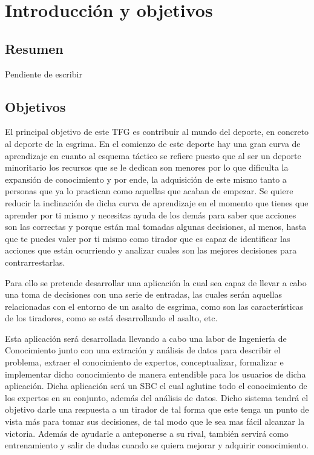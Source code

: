\chapter{Introducción y objetivos}
\label{cap: Introducción y objetivos}


\section{Resumen}
Pendiente de escribir

\section{Objetivos}

El principal objetivo de este TFG es contribuir al mundo del deporte, en concreto al
 deporte de la esgrima. En el comienzo de este deporte hay una gran curva de aprendizaje
 en cuanto al esquema táctico se refiere puesto que al ser un deporte minoritario los
 recursos que se le dedican son menores por lo que dificulta la expansión de conocimiento
 y por ende, la adquisición de este mismo tanto a personas que ya lo practican como aquellas
 que acaban de empezar. Se quiere reducir la inclinación de dicha curva de aprendizaje
 en el momento que tienes que aprender por ti mismo y necesitas ayuda de los demás
 para saber que acciones son las correctas y porque están mal tomadas algunas decisiones,
 al menos, hasta que te puedes valer por ti mismo como tirador que es capaz de identificar
 las acciones que están ocurriendo y analizar cuales son las mejores decisiones para contrarrestarlas.

Para ello se pretende desarrollar una aplicación la cual sea capaz de llevar a
 cabo una toma de decisiones con una serie de entradas, las cuales serán aquellas
 relacionadas con el entorno de un asalto de esgrima, como son las características
 de los tiradores, como se está desarrollando el asalto, etc.

Esta aplicación será desarrollada llevando a cabo una labor de Ingeniería de Conocimiento
 junto con una extración y análisis de datos para describir el problema, extraer
 el conocimiento de expertos, conceptualizar, formalizar e implementar dicho conocimiento
 de manera entendible para los usuarios de dicha aplicación. Dicha aplicación será un SBC
 el cual aglutine todo el conocimiento de los expertos en su conjunto, además del análisis
 de datos. Dicho sistema tendrá el objetivo darle una respuesta a un tirador de tal forma
 que este tenga un punto de vista más para tomar sus decisiones, de tal modo que le sea mas
 fácil alcanzar la victoria. Además de ayudarle a anteponerse a su rival, también servirá
 como entrenamiento y salir de dudas cuando se quiera mejorar y adquirir conocimiento.

